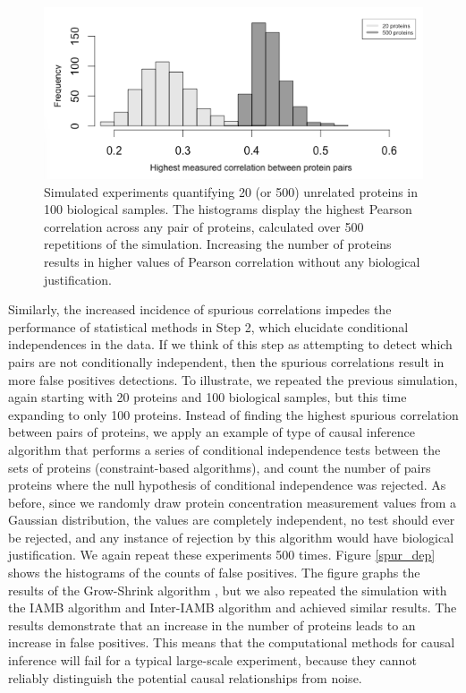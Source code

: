 \documentclass[journal=jacsat,manuscript=article]{achemso}
\def\added#1{{\color{blue} #1}}
\begin{document}
\begin{figure}[!tpb]
\centerline{\includegraphics[width=1\textwidth]{figs/spurious_corr.png}}
\caption{Simulated experiments quantifying 20 (or 500) unrelated proteins in 100 biological samples. The histograms display the highest Pearson correlation across any pair of proteins, calculated over 500 repetitions of the simulation. Increasing the number of proteins results in higher values of Pearson correlation without any biological justification.}
\label{spur_corr}
\end{figure}

Similarly, the increased incidence of spurious correlations impedes the performance of statistical methods in Step 2, which elucidate conditional independences in the data.  If we think of this step as \added{attempting to detect which pairs are not conditionally independent}, then the spurious correlations result in more false positives \added{detections}. To illustrate, we repeated the previous simulation, again starting with 20 proteins and 100 biological samples, but this time expanding to only 100 proteins.  Instead of finding the highest spurious correlation between pairs of proteins, we apply an example of type of causal inference algorithm that performs a series of conditional independence tests between the sets of proteins (constraint-based algorithms\cite{spirtes2000causation}), and count the number of pairs proteins \added{where the null hypothesis of conditional independence was rejected}.  As before, since we randomly draw protein concentration measurement values from a Gaussian distribution, the values are completely independent, \added{no test should ever be rejected, and any instance of rejection by this algorithm would have biological justification}.  We again repeat these experiments 500 times. Figure \ref{spur_dep} shows the histograms of the counts of false positives.  The figure graphs the results of the Grow-Shrink algorithm \cite{margaritis2003learning}, \added{but we also repeated the simulation with the IAMB algorithm\cite{tsamardinos2003algorithms} and Inter-IAMB algorithm\cite{yaramakala2005speculative} and achieved similar results}.    The results demonstrate that an increase in the number of proteins leads to an increase in false positives. This means that the computational methods for causal inference will fail for a typical large-scale experiment, because they cannot reliably distinguish the potential causal relationships from noise.
\end{document}
